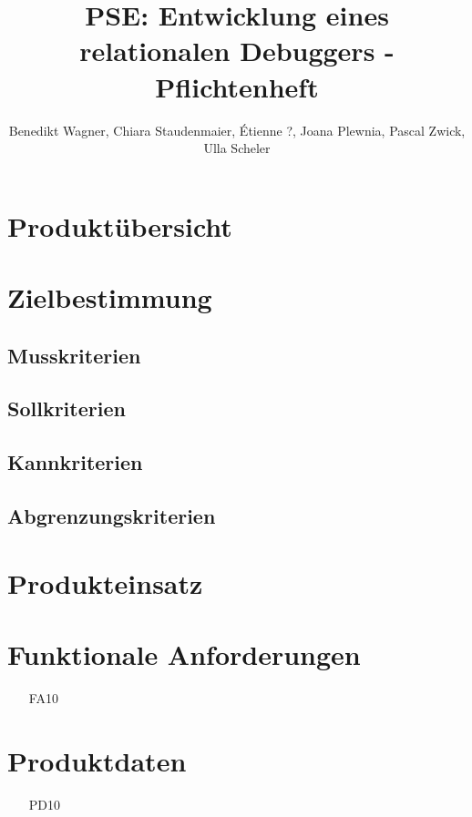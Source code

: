 \documentclass[]{scrbook}
\title{PSE: Entwicklung eines relationalen Debuggers - Pflichtenheft}
\author{Benedikt Wagner, Chiara Staudenmaier, Étienne ?, Joana Plewnia, Pascal Zwick, Ulla Scheler}
\begin{document}
\maketitle

\section{Produktübersicht}

\section{Zielbestimmung}
\subsection{Musskriterien}
\subsection{Sollkriterien}
\subsection{Kannkriterien}
\subsection{Abgrenzungskriterien}

\section{Produkteinsatz}

\section{Funktionale Anforderungen}
\begin{itemize}[nosep]
\item[FA10] %
\end{itemize}

\section{Produktdaten}
\begin{itemize}[nosep]
\item[PD10] %
\end{itemize}
\end{document}
